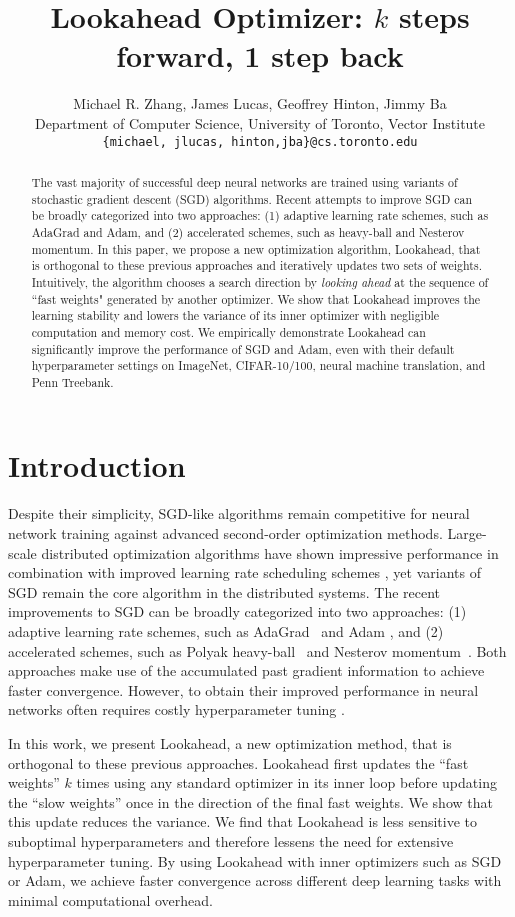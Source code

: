 \documentclass{article}
\title{Lookahead Optimizer: $k$ steps forward, 1 step back}
\author{  Michael R. Zhang, 
  James Lucas,  
  Geoffrey Hinton, 
  Jimmy Ba\\
  Department of Computer Science, University of Toronto, Vector Institute \\
  \texttt{\{michael, jlucas, hinton,jba\}@cs.toronto.edu}
}
\begin{document}
\maketitle
\begin{abstract}
The vast majority of successful deep neural networks are trained using variants of stochastic gradient descent (SGD) algorithms. Recent attempts to improve SGD can be broadly categorized into two approaches: (1) adaptive learning rate schemes, such as AdaGrad and Adam, and (2) accelerated schemes, such as heavy-ball and Nesterov momentum. In this paper, we propose a new optimization algorithm, Lookahead, that is orthogonal to these previous approaches and iteratively updates two sets of weights.
Intuitively, the algorithm chooses a search direction by \emph{looking ahead} at the sequence of ``fast weights" generated by another optimizer.
We show that Lookahead improves the learning stability and lowers the variance of its inner optimizer with negligible computation and memory cost. We empirically demonstrate Lookahead can significantly improve the performance of SGD and Adam, even with their default hyperparameter settings on ImageNet, CIFAR-10/100, neural machine translation, and Penn Treebank.  

\end{abstract} \section{Introduction}
\label{sec:intro}
Despite their simplicity, SGD-like algorithms remain competitive for neural network training against advanced second-order optimization methods.  Large-scale distributed optimization algorithms \citep{goyal2017accurate, you2018imagenet} have shown impressive performance in combination with improved learning rate scheduling schemes \citep{vaswani2017attention,radford2018improving}, yet variants of SGD remain the core algorithm in the distributed systems. The recent improvements to SGD  can be broadly categorized into two approaches:  (1) adaptive learning rate schemes, such as AdaGrad~\citep{duchi2011adaptive} and Adam \citep{kingma2014adam}, and (2) accelerated schemes, such as Polyak heavy-ball~\citep{polyak1964some} and Nesterov momentum~\citep{nesterov1983method}.  Both approaches make use of the accumulated past gradient information to achieve faster convergence.  However, to obtain their improved performance in neural networks often requires costly hyperparameter tuning  \citep{montavon2012neural}. 

In this work, we present Lookahead, a new optimization method, that is orthogonal to these previous approaches.  Lookahead first updates the ``fast weights'' \citep{hinton1987using} $k$ times using any standard optimizer in its inner loop before updating the ``slow weights'' once in the direction of the final fast weights. We show that this update reduces the variance. We find that Lookahead is less sensitive to suboptimal hyperparameters and therefore lessens the need for extensive hyperparameter tuning. By using Lookahead with inner optimizers such as SGD or Adam, we achieve faster convergence across different deep learning tasks with minimal computational overhead.
\end{document}
